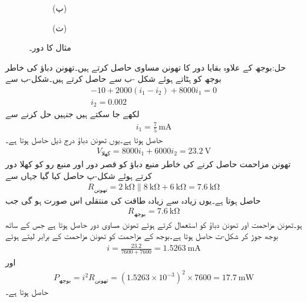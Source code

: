 \begin{figure}
\begin{subfigure}{0.5\textwidth}
\caption*{(پ)}
\end{subfigure}
\begin{subfigure}{0.5\textwidth}
\centering
{}
\caption*{(ت)}%
\end{subfigure}
\caption{مثال  کا دور۔}
\label{شکل_مسئلہ_طاقت_منتقلی_الف}
\end{figure}

حل:بوجھ کے علاوہ بقایا دور کا تھونن مساوی حاصل کرتے ہیں۔تھونن دباؤ کی خاطر بوجھ کو ہٹاتے ہوئے شکل -ب سے  حاصل کرتے ہیں۔شکل-ب سے
\begin{align*}
-10+2000(i_1-i_2)+8000i_1=0\\
i_2=0.002
\end{align*}
لکھے جا سکتے ہیں جنہیں حل کرنے سے
\begin{align*}
i_1=\frac{7}{5}\,\si{\milli\ampere}
\end{align*}
حاصل ہوتا ہے۔یوں تھونن دباؤ درج ذیل حاصل ہوتا ہے۔
\begin{align*}
V_{\text{کھلا}}=8000i_1+6000i_2 =\SI{23.2}{\volt}
\end{align*}
تھونن مزاحمت حاصل کرنے کی خاطر منبع دباؤ کو قصر دور اور منبع رو کو کھلا دور کرتے ہوئے شکل-پ حاصل کیا گیا جہاں سے
\begin{align*}
R_{\text{تھونن}}=\SI{2}{\kilo\ohm} \parallel \SI{8}{\kilo\ohm}+\SI{6}{\kilo\ohm}=\SI{7.6}{\kilo\ohm}
\end{align*}
حاصل ہوتا ہے۔یوں زیادہ سے زیادہ طاقت کی منتقلی اس صورت ہو گی جب 
\begin{align*}
R_{\text{بوجھ}}=\SI{7.6}{\kilo\ohm}
\end{align*}
ہو۔تھونن مزاحمت اور تھونن دباؤ  کو استعمال کرتے ہوئے تھونن مساوی دور حاصل ہوتا ہے جس کے ساتھ بوجھ جوڑ کر شکل-ت حاصل ہوتا ہے۔بوجھ کے مزاحمت کو تھونن مزاحمت کے برابر لیتے ہوئے
\begin{align*}
i=\frac{23.2}{7600+7600}=\SI{1.5263}{\milli\ampere}
\end{align*}
اور
\begin{align*}
P_{\text{بوجھ}}=i^2 R_{\text{تھونن}} = \left(1.5263\times 10^{-3}\right)^2 \times 7600=\SI{17.7}{\milli\watt}
\end{align*}
حاصل ہوتا ہے۔

